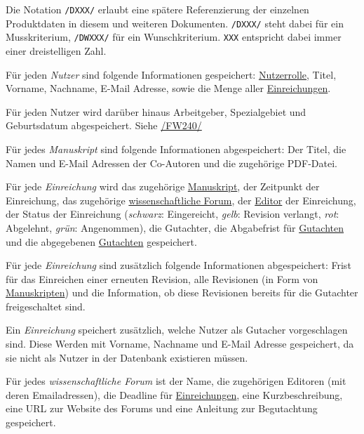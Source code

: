
Die Notation \texttt{/DXXX/} erlaubt eine spätere Referenzierung der einzelnen Produktdaten in diesem und weiteren
Dokumenten. \texttt{/DXXX/} steht dabei für ein Musskriterium, \texttt{/DWXXX/} für ein Wunschkriterium. \texttt{XXX} entspricht dabei immer einer dreistelligen Zahl.

\begin{description}
	 Für jeden \emph{Nutzer} sind folgende Informationen gespeichert: \hyperref[funkt:nutzer]{Nutzerrolle}, Titel, Vorname, Nachname, E-Mail Adresse, sowie die Menge aller \hyperref[d025]{Einreichungen}.

	 Für jeden Nutzer wird darüber hinaus Arbeitgeber, Spezialgebiet und Geburtsdatum abgespeichert. Siehe \hyperref[funkt:240]{/FW240/}

	 Für jedes \emph{Manuskript} sind folgende Informationen abgespeichert: Der Titel, die Namen und E-Mail Adressen der Co-Autoren und die zugehörige PDF-Datei.

	 Für jede \emph{Einreichung} wird das zugehörige \hyperref[d020]{Manuskript}, der Zeitpunkt der Einreichung, das zugehörige \hyperref[d030]{wissenschaftliche Forum}, der \hyperref[funkt:editor]{Editor} der Einreichung, der Status der Einreichung (\emph{schwarz}: Eingereicht, \emph{gelb}: Revision verlangt, \emph{rot}: Abgelehnt, \emph{grün}: Angenommen), die Gutachter, die Abgabefrist für \hyperref[d040]{Gutachten} und die abgegebenen \hyperref[d040]{Gutachten} gespeichert.

	 Für jede \emph{Einreichung} sind zusätzlich folgende Informationen abgespeichert: Frist für das Einreichen einer erneuten Revision, alle Revisionen (in Form von \hyperref[d020]{Manuskripten}) und die Information, ob diese Revisionen bereits für die Gutachter freigeschaltet sind.

	 Ein \emph{Einreichung} speichert zusätzlich, welche Nutzer als Gutacher vorgeschlagen sind. Diese Werden mit Vorname, Nachname und E-Mail Adresse gespeichert, da sie nicht als Nutzer in der Datenbank existieren müssen.

	 Für jedes \emph{wissenschaftliche Forum} ist der Name, die zugehörigen Editoren (mit deren Emailadressen), die Deadline für \hyperref[d025]{Einreichungen}, eine Kurzbeschreibung, eine URL zur Website des Forums und eine Anleitung zur Begutachtung gespeichert.


\end{description}
